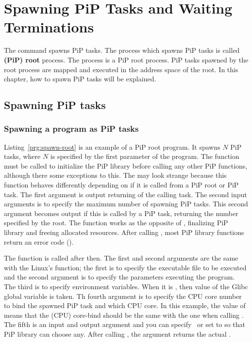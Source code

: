 
\section{Spawning PiP Tasks and Waiting Terminations}

The  command spawns PiP tasks. The
process which spawns PiP tasks is called {\bf (PiP) root} process. The
 process is a PiP root process. 
PiP tasks spawned by the root process are mapped and executed in the
address space of the root. In this chapter, how to spawn PiP tasks
will be explained.

\subsection{Spawning PiP tasks}

\subsubsection{Spawning a program as PiP tasks}

Listing~\ref{prg:spawn-root} is an example of a PiP root program. It
spawns $N$ PiP tasks, where $N$ is specified by the first parameter
of the program. The  function must be called to
initialize the PiP library before calling any other PiP functions,
although there some exceptions to this. The  may
look strange because this function behaves differently depending
on if it is called from a PiP root or PiP task. The first argument is
output returning {\PIPID} of the calling task. The second input
arguments is to specify the maximum number of spawning PiP tasks. This
second argument becomes output if this is called by a PiP task,
returning the number specified by the root.
The  function works as the opposite of
, finalizing PiP library and freeing allocated 
resources. After calling , most PiP library
functions return an error code ().

The  function is called after then. The first and
second arguments are the same with the Linux's 
function; the first is to specify the executable file to be executed
and the second argument is to specify the parameters executing the
program. The third is to specify environment variables. When it is
{\NULL}, then value of the Glibc global variable  is
taken. Th fourth argument is to specify the CPU core number to bind
the spawned PiP task and which CPU core. In this example, the value of
 means that the (CPU) core-bind should be
the same with the one when calling . The fifth
is an input and output argument and you can specify \PIPID\ or
set to  so that PiP library can choose
any. After calling , the argument returns the
actual \PIPID. 

